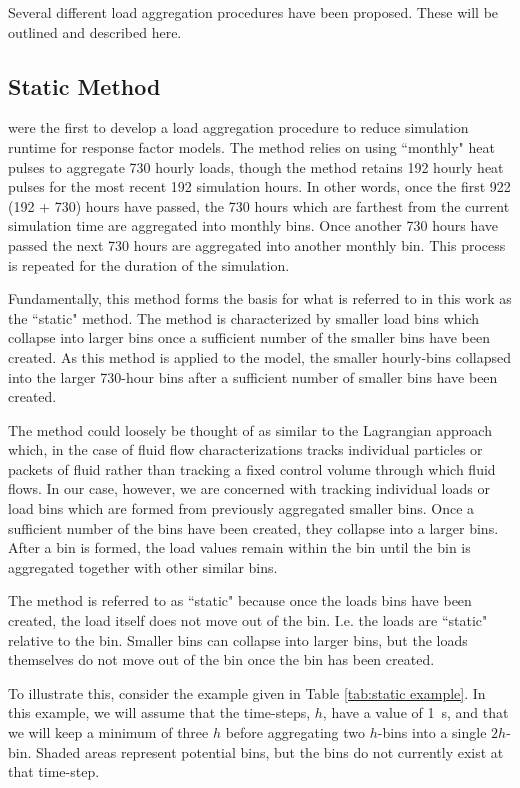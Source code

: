 \documentclass[review,12pt]{elsarticle}
\begin{document}
Several different load aggregation procedures have been proposed. These will be outlined and described here.

\subsection{Static Method}

\cite{YavuzturkSpitler1999} were the first to develop a load aggregation procedure to reduce simulation runtime for response factor models. The method relies on using ``monthly" heat pulses to aggregate 730 hourly loads, though the method retains 192 hourly heat pulses for the most recent 192 simulation hours. In other words, once the first 922 (192 + 730) hours have passed, the 730 hours which are farthest from the current simulation time are aggregated into monthly bins. Once another 730 hours have passed the next 730 hours are aggregated into another monthly bin. This process is repeated for the duration of the simulation.

Fundamentally, this method forms the basis for what is referred to in this work as the ``static" method. The method is characterized by smaller load bins which collapse into larger bins once a sufficient number of the smaller bins have been created. As this method is applied to the \cite{YavuzturkSpitler1999} model, the smaller hourly-bins collapsed into the larger 730-hour bins after a sufficient number of smaller bins have been created.

The method could loosely be thought of as similar to the Lagrangian approach which, in the case of fluid flow characterizations tracks individual particles or packets of fluid rather than tracking a fixed control volume through which fluid flows. In our case, however, we are concerned with tracking individual loads or load bins which are formed from previously aggregated smaller bins. Once a sufficient number of the bins have been created, they collapse into a larger bins. After a bin is formed, the load values remain within the bin until the bin is aggregated together with other similar bins.

The method is referred to as ``static" because once the loads bins have been created, the load itself does not move out of the bin. I.e. the loads are ``static" relative to the bin. Smaller bins can collapse into larger bins, but the loads themselves do not move out of the bin once the bin has been created.

To illustrate this, consider the example given in Table \ref{tab:static example}. In this example, we will assume that the time-steps, $h$, have a value of \SI{1}{\second}, and that we will keep a minimum of three $h$ before aggregating two $h$-bins into a single $2h$-bin. Shaded areas represent potential bins, but the bins do not currently exist at that time-step.
\end{document}
